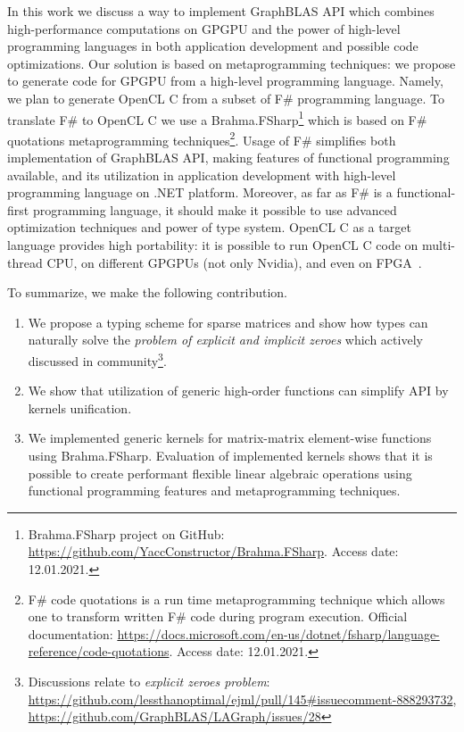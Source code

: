 In this work we discuss a way to implement GraphBLAS API which combines high-performance computations on GPGPU and the power of high-level programming languages in both application development and possible code optimizations.
Our solution is based on metaprogramming techniques: we propose to generate code for GPGPU from a high-level programming language.
Namely, we plan to generate OpenCL C from a subset of  F\# programming language.
To translate F\# to OpenCL C we use a Brahma.FSharp\footnote{Brahma.FSharp project on GitHub: \url{https://github.com/YaccConstructor/Brahma.FSharp}. Access date: 12.01.2021.} which is based on F\# quotations metaprogramming techniques\footnote{F\# code quotations is a run time metaprogramming technique which allows one to transform written F\# code during program execution. Official documentation: \url{https://docs.microsoft.com/en-us/dotnet/fsharp/language-reference/code-quotations}. Access date: 12.01.2021.}.
Usage of F\# simplifies both implementation of GraphBLAS API, making features of functional programming available, and its utilization in application development with high-level programming language on .NET platform. 
Moreover, as far as F\# is a functional-first programming language, it should make it possible to use advanced optimization techniques and power of type system.
OpenCL C as a target language provides high portability: it is possible to run OpenCL C code on multi-thread CPU, on different GPGPUs (not only Nvidia), and even on FPGA~\cite{kenter2019invited, 6567546}.

To summarize, we make the following contribution.
\begin{enumerate}
    \item We propose a typing scheme for sparse matrices and show how types can naturally solve the \textit{problem of explicit and implicit zeroes} which actively discussed in community\footnote{Discussions relate to \textit{explicit zeroes problem}: \url{https://github.com/lessthanoptimal/ejml/pull/145\#issuecomment-888293732}, \url{https://github.com/GraphBLAS/LAGraph/issues/28}}.
    \item We show that utilization of generic high-order functions can simplify API by kernels unification.
    \item We implemented generic kernels for matrix-matrix element-wise functions using Brahma.FSharp. 
    Evaluation of implemented kernels shows that it is possible to create performant flexible linear algebraic operations using functional programming features and metaprogramming techniques.
\end{enumerate}   